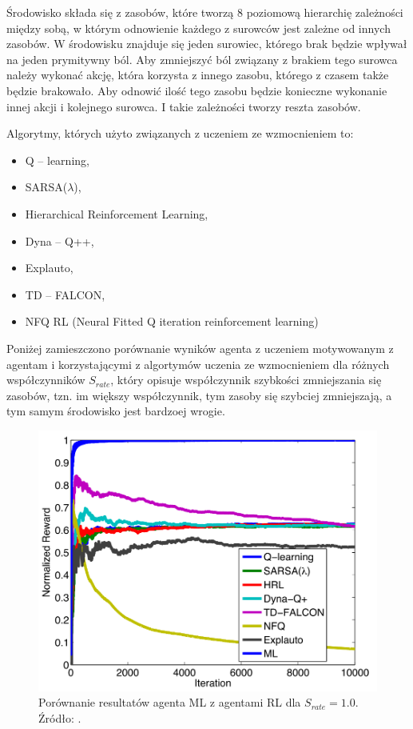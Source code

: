 Środowisko składa się z zasobów, które tworzą 8 poziomową hierarchię 
zależności między sobą, w którym odnowienie każdego z surowców jest zależne 
od innych zasobów. W środowisku znajduje się jeden surowiec, którego 
brak będzie wpływał na jeden prymitywny ból. Aby zmniejszyć ból związany 
z brakiem tego surowca należy wykonać akcję, która korzysta z innego 
zasobu, którego z czasem także będzie brakowało. Aby odnowić ilość tego 
zasobu będzie konieczne wykonanie innej akcji i kolejnego surowca. 
I takie zależności tworzy reszta zasobów.

Algorytmy, których użyto związanych z uczeniem ze wzmocnieniem to:

\begin{itemize}
    \item Q -- learning,
    \item SARSA($\lambda$),
    \item Hierarchical Reinforcement Learning,
    \item Dyna -- Q++,
    \item Explauto,
    \item TD -- FALCON,
    \item NFQ RL (Neural Fitted Q iteration reinforcement learning)
\end{itemize}

Poniżej zamieszczono porównanie wyników agenta z uczeniem motywowanym z agentam
i korzystającymi z algortymów uczenia ze wzmocnieniem dla różnych współczynników
$S_{rate}$, który opisuje współczynnik szybkości zmniejszania się zasobów, 
tzn. im większy współczynnik, tym zasoby się szybciej zmniejszają, a tym samym
środowisko jest bardzoej wrogie.

\begin{figure}[H]
    \centering
    \includegraphics[width=0.55\linewidth]{rozdzial4/images/ml_vs_rl_blackbox_srate_1}
    \caption{Porównanie resultatów agenta ML z agentami RL dla $S_{rate}=1.0$. 
    Źródło: \cite{ml_vs_rl_comparative_study}.}
    \label{fig:ml_vs_rl_blackbox_srate1}
\end{figure}

